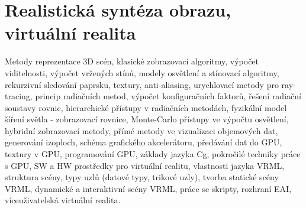 \newpage
\section{Realistická syntéza obrazu, virtuální realita}
\begin{pozadavky}
\begin{pitemize}
\item Metody reprezentace 3D scén, klasické zobrazovací algoritmy, výpočet viditelnosti, výpočet vržených stínů, modely osvětlení a stínovací algoritmy, rekurzivní sledování paprsku, textury, anti-aliasing, urychlovací metody pro ray-tracing, princip radiačních metod, výpočet konfiguračních faktorů, řešení radiační soustavy rovnic, hierarchické přístupy v radiačních metodách, fyzikální model šíření světla - zobrazovací rovnice, Monte-Carlo přístupy ve výpočtu osvětlení, hybridní zobrazovací metody, přímé metody ve vizualizaci objemových dat, generování izoploch, schéma grafického akcelerátoru, předávání dat do GPU, textury v GPU, programování GPU, základy jazyka Cg, pokročilé techniky práce s GPU, SW a HW prostředky pro virtuální realitu, vlastnosti jazyka VRML, struktura scény, typy uzlů (datové typy, trikové uzly), tvorba statické scény VRML, dynamické a interaktivní scény VRML, práce se skripty, rozhraní EAI, víceuživatelská virtuální realita.
\end{pitemize}
\end{pozadavky}